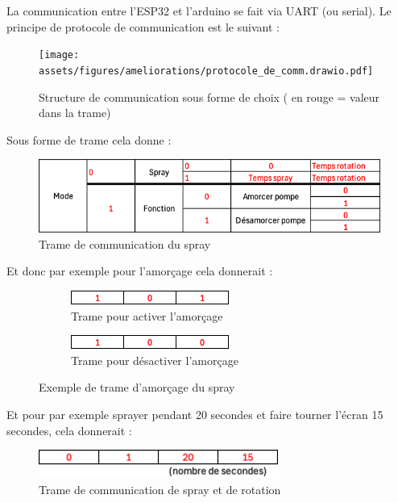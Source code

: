 \newpage
La communication entre l'ESP32 et l'arduino se fait via UART (ou serial). Le principe de protocole de communication est le suivant :
\begin{figure}[H]
    \centering
    \texttt{[image: assets/figures/ameliorations/protocole\_de\_comm.drawio.pdf]}
    \caption[Structure de communication]{Structure de communication sous forme de choix ( en \color{red} rouge \color{black} = valeur dans la trame)}
\end{figure}
Sous forme de trame cela donne :
\begin{figure}[H]
    \centering
    \includegraphics[page = 1, width = \textwidth]{assets/figures/ameliorations/trame_spray.png}
    \caption[Trame de communication du spray]{Trame de communication du spray}
\end{figure}
Et donc par exemple pour l'amorçage cela donnerait :
\begin{figure}[H]
    \centering
    \begin{subfigure}{.5\textwidth}
        \centering
        \includegraphics[width=0.9\linewidth]{assets/figures/ameliorations/trame_amorcage_on.png}
        \caption{Trame pour activer l'amorçage}

    \end{subfigure}%
    \begin{subfigure}{.5\textwidth}
        \centering
        \includegraphics[width=0.9\linewidth]{assets/figures/ameliorations/trame_amorcage_off.png}
        \caption{Trame pour désactiver l'amorçage}

    \end{subfigure}
    \caption{Exemple de trame d'amorçage du spray}

\end{figure}
Et pour par exemple sprayer pendant 20 secondes et faire tourner l'écran 15 secondes, cela donnerait :
\begin{figure}[H]
    \centering
    \includegraphics[page = 1, width = 0.7\textwidth]{assets/figures/ameliorations/trame_rota_spray.png}
    \caption{Trame de communication de spray et de rotation}
\end{figure}

